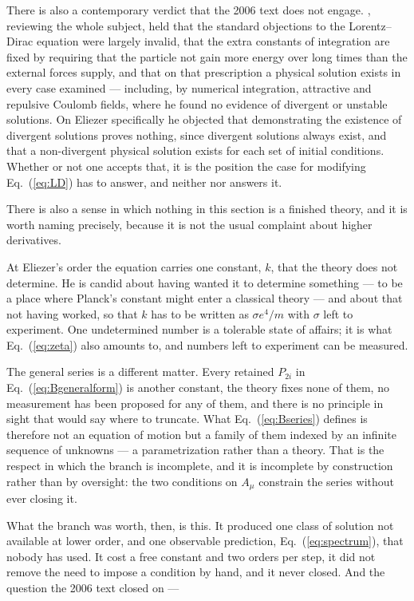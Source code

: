 \documentclass[preprint]{aastex701}
\begin{document}
There is also a contemporary verdict that the 2006 text does not engage.
\citet{plass1961}, reviewing the whole subject, held that the standard
objections to the Lorentz--Dirac equation were largely invalid, that the extra
constants of integration are fixed by requiring that the particle not gain more
energy over long times than the external forces supply, and that on that
prescription a physical solution exists in every case examined --- including,
by numerical integration, attractive and repulsive Coulomb fields, where he
found no evidence of divergent or unstable solutions. On Eliezer specifically
he objected that demonstrating the existence of divergent solutions proves
nothing, since divergent solutions always exist, and that a non-divergent
physical solution exists for each set of initial conditions. Whether or not one
accepts that, it is the position the case for modifying Eq.~(\ref{eq:LD}) has
to answer, and neither \citet{eliezer1947} nor \citet{zhang2006} answers it.

There is also a sense in which nothing in this section is a finished theory,
and it is worth naming precisely, because it is not the usual complaint about
higher derivatives.

At Eliezer's order the equation carries one constant, $k$, that the theory does
not determine. He is candid about having wanted it to determine something --- to
be a place where Planck's constant might enter a classical theory --- and about
that not having worked, so that $k$ has to be written as $\sigma e^4/m$ with
$\sigma$ left to experiment. One undetermined number is a tolerable state of
affairs; it is what Eq.~(\ref{eq:zeta}) also amounts to, and numbers left to
experiment can be measured.

The general series is a different matter. Every retained $P_{2i}$ in
Eq.~(\ref{eq:Bgeneralform}) is another constant, the theory fixes none of them,
no measurement has been proposed for any of them, and there is no principle in
sight that would say where to truncate. What Eq.~(\ref{eq:Bseries}) defines is
therefore not an equation of motion but a family of them indexed by an infinite
sequence of unknowns --- a parametrization rather than a theory. That is the
respect in which the branch is incomplete, and it is incomplete by construction
rather than by oversight: the two conditions on $A_\mu$ constrain the series
without ever closing it.

What the branch was worth, then, is this. It produced one class of solution not
available at lower order, and one observable prediction,
Eq.~(\ref{eq:spectrum}), that nobody has used. It cost a free constant and two
orders per step, it did not remove the need to impose a condition by hand, and
it never closed.
And the question the 2006 text closed on ---
\end{document}
